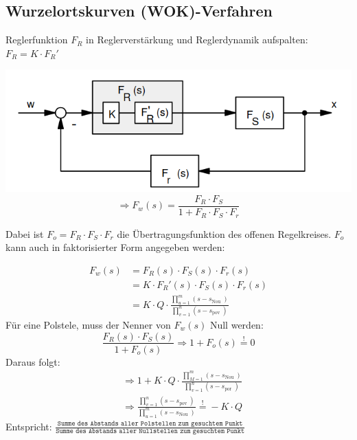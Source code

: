 \documentclass[10pt,a4paper]{article}
\begin{document}
  \subsection{Wurzelortskurven (WOK)-Verfahren}
  \begin{mdframed}[style=exercise]
      Reglerfunktion $F_R$ in Reglerverstärkung und Reglerdynamik aufspalten:
      $F_R =K \cdot F_R ' $\\
  \end{mdframed}
  \includegraphics[width=.45\textwidth]{Figures/WOKkreis.png}
  \[
  \Rightarrow F_w (s)= \dfrac {F_R \cdot F_S} {1+F_R \cdot F_S \cdot F_r}\]
       \begin{mdframed}[style=exercise]

     Dabei ist $F_o = F_R \cdot F_S \cdot F_r$ die Übertragungsfunktion des offenen Regelkreises.
    $F_o$ kann auch in faktorisierter Form angegeben werden:
  \end{mdframed}
  \begin{align*}
  F_w (s)&= F_R (s) \cdot F_S (s) \cdot F_r (s)\\
        &=K \cdot F_R '(s) \cdot F_S (s) \cdot F_r (s)\\
        &=K \cdot Q \cdot \frac{\prod_{u=1}^{m}\left(s-s_{\text {Nou }}\right)}{\prod_{v=1}^{n}\left(s-s_{\text {pov }}\right)}
  \end{align*}
  Für eine Polstele, muss der Nenner von $F_w (s)$ Null werden:
  \[ \dfrac{F_R (s) \cdot F_S (s)}{1+F_o (s)} \Rightarrow 1+F_o (s) \stackrel{!}{=}0\]
  Daraus folgt:
  \begin{align*}
      &\Rightarrow 1+ K \cdot Q \cdot \frac{\prod_{M=1}^{m}\left(s-s_{\text {Nou }}\right)}{\prod_{v=1}^{n}\left(s-s_{\text {por }}\right)}\\
      &\Rightarrow \frac{\prod_{v=1}^{n}\left(s-s_{\text {pov }}\right)}{\prod_{u=1}^{m}\left(s-s_{\text {Nou }}\right)} \stackrel{!}{=} -K \cdot Q
  \end{align*}
  Entspricht: $\frac{\texttt{Summe des Abstands aller Polstellen zum gesuchtem Punkt}}{\texttt{Summe des Abstands aller Nullstellen zum gesuchtem Punkt}}$
\end{document}
